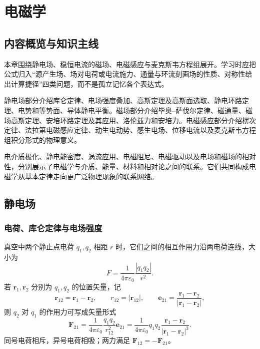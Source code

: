 %
%

\chapter{电磁学}

\section*{内容概览与知识主线}

本章围绕静电场、稳恒电流的磁场、电磁感应与麦克斯韦方程组展开。学习时应把公式归入“源产生场、场对电荷或电流施力、通量与环流刻画场的性质、对称性给出计算捷径”四类问题，而不是孤立记忆各个表达式。

\begin{summary}[本章内容概览]
静电场部分介绍库仑定律、电场强度叠加、高斯定理及高斯面选取、静电环路定理、电势和等势面、导体静电平衡。磁场部分介绍毕奥--萨伐尔定律、磁通量、磁场高斯定理、安培环路定理及其应用、洛伦兹力和安培力。电磁感应部分介绍楞次定律、法拉第电磁感应定律、动生电动势、感生电场、位移电流以及麦克斯韦方程组积分形式的物理意义。
\end{summary}

\begin{attention}[背景与拓展内容]
电介质极化、静电能密度、涡流应用、电磁阻尼、电磁驱动以及电场和磁场的相对性，分别展示了电磁学与介质、能量、材料和相对论之间的联系。它们共同构成电磁学从基本定律走向更广泛物理现象的联系网络。
\end{attention}

\section{静电场}

\subsection{电荷、库仑定律与电场强度}

\begin{theorem}[库仑定律]\label{thm:coulomb-law}
真空中两个静止点电荷 $q_1,q_2$ 相距 $r$ 时，它们之间的相互作用力沿两电荷连线，大小为
\[
  F=\frac{1}{4\pi\varepsilon_0}\frac{|q_1q_2|}{r^2}.
\]
若 $\bm r_1,\bm r_2$ 分别为 $q_1,q_2$ 的位置矢量，记
\[
  \bm r_{12}=\bm r_1-\bm r_2,\qquad
  r_{12}=|\bm r_{12}|,\qquad
  \bm e_{21}=\frac{\bm r_1-\bm r_2}{|\bm r_1-\bm r_2|},
\]
则 $q_2$ 对 $q_1$ 的作用力可写成矢量形式
\[
  \bm F_{21}=\frac{1}{4\pi\varepsilon_0}\frac{q_1q_2}{r_{12}^2}\bm e_{21}
  =\frac{1}{4\pi\varepsilon_0}q_1q_2\frac{\bm r_1-\bm r_2}{|\bm r_1-\bm r_2|^3}.
\]
同号电荷相斥，异号电荷相吸；两力满足 $\bm F_{12}=-\bm F_{21}$。
\end{theorem}

